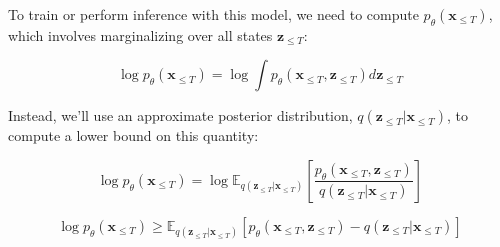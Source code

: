 To train or perform inference with this model, we need to compute $p_\theta (\mathbf{x}_{\leq T})$, which involves marginalizing over all states $\mathbf{z}_{\leq T}$:

\begin{equation}
	\log p_\theta (\mathbf{x}_{\leq T}) = \log \int p_\theta (\mathbf{x}_{\leq T}, \mathbf{z}_{\leq T}) d \mathbf{z}_{\leq T}
\end{equation}

\noindent Instead, we'll use an approximate posterior distribution, $q (\mathbf{z}_{\leq T} | \mathbf{x}_{\leq T})$, to compute a lower bound on this quantity:

\begin{equation}
	\log p_\theta (\mathbf{x}_{\leq T}) = \log \mathbb{E}_{q (\mathbf{z}_{\leq T} | \mathbf{x}_{\leq T})} \left[ \frac{p_\theta (\mathbf{x}_{\leq T}, \mathbf{z}_{\leq T})}{q (\mathbf{z}_{\leq T} | \mathbf{x}_{\leq T})} \right]
\end{equation}

\begin{equation}
	\log p_\theta (\mathbf{x}_{\leq T}) \geq \mathbb{E}_{q (\mathbf{z}_{\leq T} | \mathbf{x}_{\leq T})} \left[ p_\theta (\mathbf{x}_{\leq T}, \mathbf{z}_{\leq T}) - q (\mathbf{z}_{\leq T} | \mathbf{x}_{\leq T}) \right]
\end{equation}
